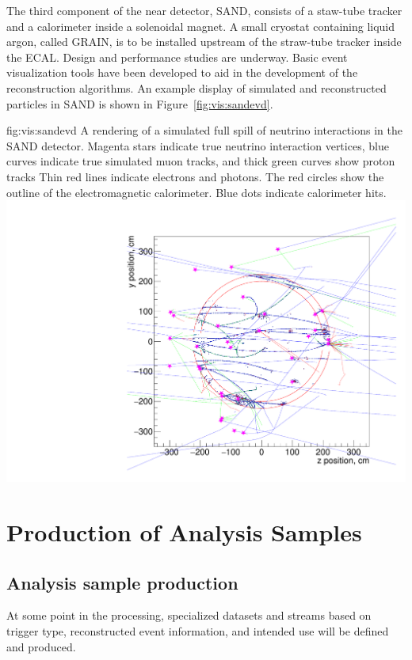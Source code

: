 \documentclass[../main-v1.tex]{subfiles}
\begin{document}
The third component of the near detector, SAND, consists of a staw-tube tracker and a calorimeter inside a solenoidal magnet.  A small cryostat containing liquid argon, called GRAIN, is to be installed upstream of the straw-tube tracker inside the ECAL.  Design and performance studies are underway.  Basic event visualization tools have been developed to aid in the development of the reconstruction algorithms.  An example display of simulated and reconstructed particles in SAND is shown in Figure~\ref{fig:vis:sandevd}.

\begin{dunefigure}
{fig:vis:sandevd} 
{A rendering of a simulated full spill of neutrino interactions in the SAND detector. Magenta stars indicate true neutrino interaction vertices, blue curves indicate true simulated muon tracks, and thick green curves show proton tracks  Thin red lines indicate electrons and photons.  The red circles show the outline of the electromagnetic calorimeter.  Blue dots indicate calorimeter hits.}
\includegraphics[width=0.9 \textwidth]{graphics/EventDisplays/sand_detector_view_stt_17924.pdf}
\end{dunefigure}


\section{Production of Analysis Samples}

\subsection{Analysis sample production}
At some point in the processing, specialized datasets and streams based on trigger type, reconstructed event information, and intended use will be defined and produced.
\end{document}
